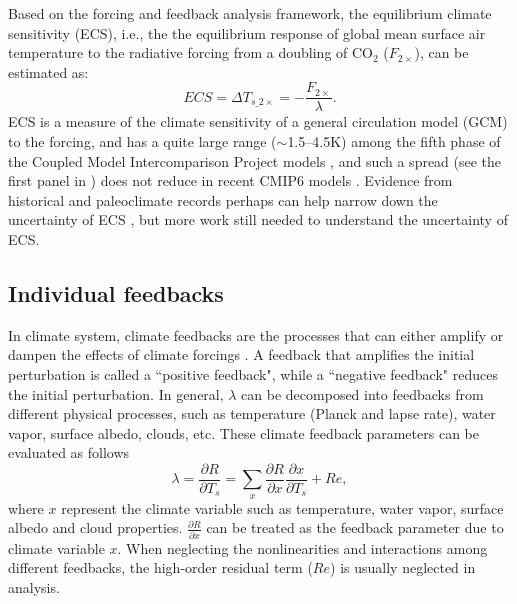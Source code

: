 Based on the forcing and feedback analysis framework, the equilibrium climate sensitivity (ECS), i.e., the the equilibrium response of global mean surface air temperature to the radiative forcing from a doubling of CO$_2$ ($F_{2\times}$), can be estimated as:
\begin{equation}
    ECS = \Delta T_{s\_2\times}=-\frac{F_{2\times}}{\lambda}.
    \label{eq:ecs}
\end{equation}
ECS is a measure of the climate sensitivity of a general circulation model (GCM) to the forcing, and has a quite large range ($\sim$1.5--4.5K) among the fifth phase of the Coupled Model Intercomparison Project \citep[CMIP5;][]{Taylor2012overview} models \citep[e.g.,][]{Andrews2012forcing,Ceppi2017}, and such a spread (see the first panel in ) does not reduce in recent CMIP6 \citep{Eyring2016overview} models  \citep{Zelinka2020causes}. Evidence from historical and paleoclimate records perhaps can help narrow down the uncertainty of ECS \citep{Sherwood2020}, but more work still needed to understand the uncertainty of ECS.

\subsection{Individual feedbacks}
In climate system, climate feedbacks are the processes that can either amplify or dampen the effects of climate forcings \citep{Hansen1984}. A feedback that amplifies the initial perturbation is called a ``positive feedback", while a ``negative feedback" reduces the initial perturbation. In general, $\lambda$ can be decomposed into feedbacks from different physical processes, such as temperature (Planck and lapse rate), water vapor, surface albedo, clouds, etc. These climate feedback parameters can be evaluated as follows
\begin{equation}
    \lambda = \frac{\partial R}{\partial T_s} = \sum_x \frac{\partial R}{\partial x}\frac{\partial x}{\partial T_s} + Re, %
    \label{eq:lambda}
\end{equation}
where $x$ represent the climate variable such as temperature, water vapor, surface albedo and cloud properties. $\frac{\partial R}{\partial x}$ can be treated as the feedback parameter due to climate variable $x$. When neglecting the nonlinearities and interactions among different feedbacks, the high-order residual term ($Re$) is usually neglected in analysis. 

